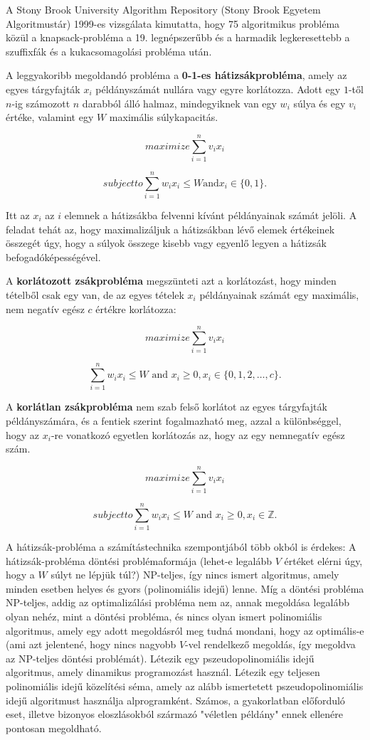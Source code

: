 	A Stony Brook University Algorithm Repository (Stony Brook Egyetem Algoritmustár) 1999-es vizsgálata kimutatta, hogy 75 algoritmikus probléma közül a knapsack-probléma a 19. legnépszerűbb és a harmadik legkeresettebb a szuffixfák és a kukacsomagolási probléma után. 
	
	
	
	A leggyakoribb megoldandó probléma a \textbf{0-1-es hátizsákprobléma}, amely az egyes tárgyfajták $x_i$ példányszámát nullára vagy egyre korlátozza. Adott egy $1$-től $n$-ig számozott $n$ darabból álló halmaz, mindegyiknek van egy $w_i$ súlya és egy $v_i$ értéke, valamint egy $W$ maximális súlykapacitás.
	
	$$maximize \sum_{i=1}^n v_i x_i$$
	
	$$subject to \sum_{i=1}^n w_i x_i \leq W \text{and} x_i \in \{0,1\}.$$
	
	Itt az $x_i$ az $i$ elemnek a hátizsákba felvenni kívánt példányainak számát jelöli. A feladat tehát az, hogy maximalizáljuk a hátizsákban lévő elemek értékeinek összegét úgy, hogy a súlyok összege kisebb vagy egyenlő legyen a hátizsák befogadóképességével. 

	
	A \textbf{korlátozott zsákprobléma} megszünteti azt a korlátozást, hogy minden tételből csak egy van, de az egyes tételek $x_i$ példányainak számát egy maximális, nem negatív egész $c$ értékre korlátozza: 
	
	$$maximize \sum_{i=1}^n v_i x_i$$
	
	$$\sum_{i=1}^n w_i x_i \leq W \text{ and } x_i \geq0, x_i \in \{0,1,2,\dots,c\}.$$
	
	A \textbf{korlátlan zsákprobléma} nem szab felső korlátot az egyes tárgyfajták példányszámára, és a fentiek szerint fogalmazható meg, azzal a különbséggel, hogy az $x_i$-re vonatkozó egyetlen korlátozás az, hogy az egy nemnegatív egész szám. 
	
	$$maximize \sum_{i=1}^n v_i x_i$$
	
	$$subject to \sum_{i=1}^n w_i x_i \leq W \text{ and } x_i \geq 0, x_i \in \mathbb{Z}.$$
	
	
	A há\-ti\-zsák-\-prob\-lé\-ma a számítástechnika szempontjából több okból is érdekes:
	A há\-ti\-zsák-\-prob\-lé\-ma döntési problémaformája (lehet-e legalább $V$ értéket elérni úgy, hogy a $W$ súlyt ne lépjük túl?) NP-teljes, így nincs ismert algoritmus, amely minden esetben helyes és gyors (polinomiális idejű) lenne.
	Míg a döntési probléma NP-teljes, addig az optimalizálási probléma nem az, annak megoldása legalább olyan nehéz, mint a döntési probléma, és nincs olyan ismert polinomiális algoritmus, amely egy adott megoldásról meg tudná mondani, hogy az optimális-e (ami azt jelentené, hogy nincs nagyobb $V$-vel rendelkező megoldás, így megoldva az NP-teljes döntési problémát).
	Létezik egy pszeudopolinomiális idejű algoritmus, amely dinamikus programozást használ.
	Létezik egy teljesen polinomiális idejű közelítési séma, amely az alább ismertetett pszeudopolinomiális idejű algoritmust használja alprogramként.
	Számos, a gyakorlatban előforduló eset, illetve bizonyos eloszlásokból származó "véletlen példány" ennek ellenére pontosan megoldható.
	
